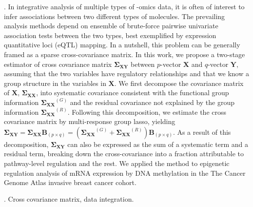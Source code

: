 \documentclass[12pt]{article}
\newcommand{\bX}{\mathbf{X}}
\newcommand{\bY}{\mathbf{Y}}
\newcommand{\bSxy}{\mathbf{\Sigma_{XY}}}
\newcommand{\bSxx}{\mathbf{\Sigma_{XX}}}
\newcommand{\bB}{\mathbf{B}}
\begin{document}
. In integrative analysis of multiple types of -omics data, it is often of interest to infer associations between two different types of molecules. The prevailing analysis methods depend on ensemble of brute-force pairwise univariate association tests between the two types, best exemplified by expression quantitative loci (eQTL) mapping. In a nutshell, this problem can be generally framed as a sparse cross-covariance matrix. %
In this work, we propose a two-stage estimator of cross covariance matrix $\bSxy$ between $p$-vector $\bX$ and $q$-vector $\bY$, assuming that the two variables have regulatory relationships and that we know a group structure in the variables in $\bX$. 
We first decompose the covariance matrix of $\bX$, $\bSxx$, into systematic covariance consistent with the functional group information $\bSxx^{(G)}$ and the residual covariance not explained by the group information $\bSxx^{(R)}$. Following this decomposition, we estimate the cross covariance matrix by multi-response group lasso, yielding $\bSxy = \bSxx \bB_{(p \times q)} = (\bSxx^{(G)} + \bSxx^{(R)}) \bB_{(p \times q)}$. As a result of this decomposition, $\bSxy$ can also be expressed as the sum of a systematic term and a residual term, breaking down the cross-covariance into a fraction attributable to pathway-level regulation and the rest. 
We applied the method to epigenetic regulation analysis of mRNA expression by DNA methylation in the The Cancer Genome Atlas invasive breast cancer cohort. 

\vskip 2mm

.
Cross covariance matrix, data integration. 
\end{document}
